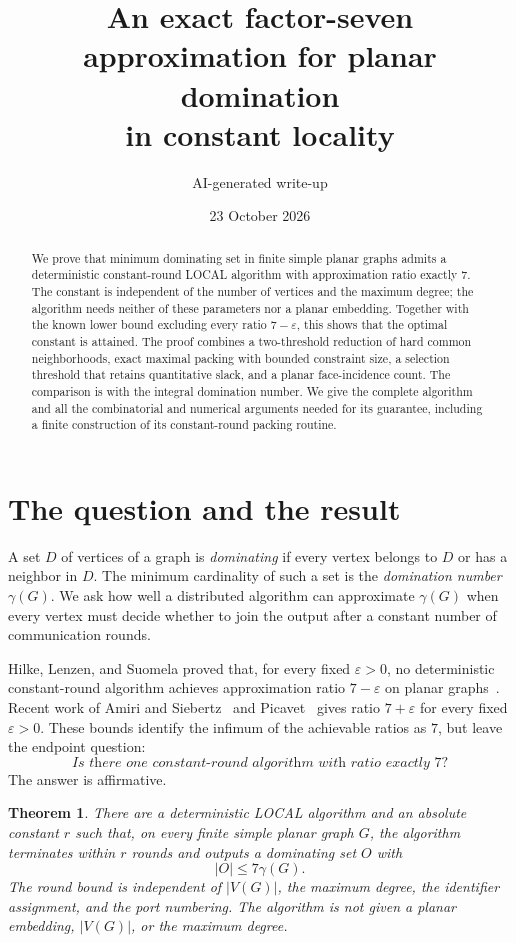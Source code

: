 \documentclass[11pt,a4paper]{article}
\title{An exact factor-seven approximation for planar domination\\
  in constant locality}
\author{AI-generated write-up}
\date{23 October 2026}
\newtheorem{theorem}{Theorem}[section]
\theoremstyle{definition}
\theoremstyle{remark}
\newcommand{\LOCAL}{\textsf{LOCAL}}
\begin{document}
\maketitle

\begin{abstract}
We prove that minimum dominating set in finite simple planar graphs admits a
deterministic constant-round \LOCAL{} algorithm with approximation ratio
exactly \(7\). The constant is independent of the number of vertices and the
maximum degree; the algorithm needs neither of these parameters nor a planar
embedding. Together with the known lower bound excluding every ratio
\(7-\varepsilon\), this shows that the optimal constant is attained.
The proof combines a two-threshold reduction of hard common neighborhoods,
exact maximal packing with bounded constraint size, a selection threshold
that retains quantitative slack, and a planar face-incidence count.
The comparison is with the integral domination number. We give the complete
algorithm and all the combinatorial and numerical arguments needed for its
guarantee, including a finite construction of its constant-round packing
routine.
\end{abstract}

\section{The question and the result}
\label{sec:introduction}

A set \(D\) of vertices of a graph is \emph{dominating} if every vertex
belongs to \(D\) or has a neighbor in \(D\). The minimum cardinality of such
a set is the \emph{domination number} \(\gamma(G)\). We ask how well a
distributed algorithm can approximate \(\gamma(G)\) when every vertex must
decide whether to join the output after a constant number of communication
rounds.

Hilke, Lenzen, and Suomela proved that, for every fixed
\(\varepsilon>0\), no deterministic constant-round algorithm achieves
approximation ratio \(7-\varepsilon\) on planar graphs~\cite{HLS14}.
Recent work of Amiri and Siebertz~\cite{AS26} and
Picavet~\cite{Picavet26} gives ratio \(7+\varepsilon\) for every fixed
\(\varepsilon>0\). These bounds identify the infimum of the achievable
ratios as \(7\), but leave the endpoint question:
\[
  \textit{Is there one constant-round algorithm with ratio exactly \(7\)?}
\]
The answer is affirmative.

\begin{theorem}\label{thm:main}
There are a deterministic \LOCAL{} algorithm and an absolute constant \(r\)
such that, on every finite simple planar graph \(G\), the algorithm terminates
within \(r\) rounds and outputs a dominating set \(O\) with
\[
  |O|\leq 7\gamma(G).
\]
The round bound is independent of \(|V(G)|\), the maximum degree, the
identifier assignment, and the port numbering. The algorithm is not given
a planar embedding, \(|V(G)|\), or the maximum degree.
\end{theorem}
\end{document}
